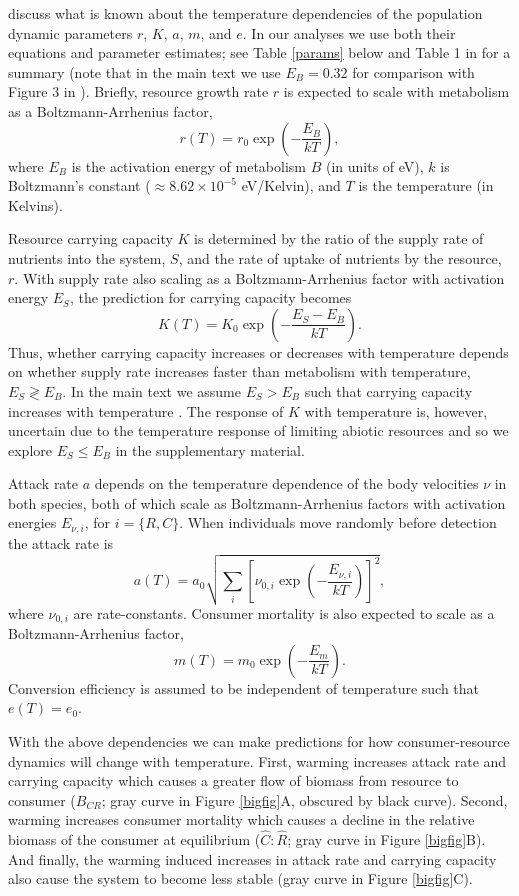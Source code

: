 \documentclass[11pt]{article}
\begin{document}
\cite{Gilbert2014} discuss what is known about the temperature dependencies of the population dynamic parameters $r$, $K$, $a$, $m$, and $e$. 
In our analyses we use both their equations and parameter estimates; see Table \ref{params} below and Table 1 in \cite{Gilbert2014} for a summary (note that in the main text we use $E_B = 0.32$ for comparison with Figure 3 in \citealt{Gilbert2014}).
Briefly, resource growth rate $r$ is expected to scale with metabolism as a Boltzmann-Arrhenius factor, 
\[r(T) = r_0 \exp \left(-\frac{E_B}{kT} \right),\] 
where $E_B$ is the activation energy of metabolism $B$ (in units of eV), $k$ is Boltzmann's constant ($\approx 8.62 \times 10^{-5}$ eV/Kelvin), and $T$ is the temperature (in Kelvins).

Resource carrying capacity $K$ is determined by the ratio of the supply rate of nutrients into the system, $S$, and the rate of uptake of nutrients by the resource, $r$.
With supply rate also scaling as a Boltzmann-Arrhenius factor with activation energy $E_S$, the prediction for carrying capacity becomes
\[K(T) = K_0 \exp \left(-\frac{E_S - E_B}{kT} \right).\] 
Thus, whether carrying capacity increases or decreases with temperature depends on whether supply rate increases faster than metabolism with temperature, $E_S \gtrless E_B$.
In the main text we assume $E_S>E_B$ such that carrying capacity increases with temperature \citep{DeLong2011,Gilbert2014}.
The response of $K$ with temperature is, however, uncertain due to the temperature response of limiting abiotic resources \citep{Savage2004,OConnor2011,Gilbert2014} and so we explore $E_S\leq E_B$ in the supplementary material.

Attack rate $a$ depends on the temperature dependence of the body velocities $\nu$ in both species, both of which scale as Boltzmann-Arrhenius factors with activation energies $E_{\nu,i}$, for $i=\{R,C\}$.
When individuals move randomly before detection the attack rate is \citep{Dell2014}
\[a(T) = a_0 \sqrt{\sum_i \left[\nu_{0,i} \exp \left(-\frac{E_{\nu,i}}{kT} \right) \right]^2},\] 
where $\nu_{0,i}$ are rate-constants.
Consumer mortality is also expected to scale as a Boltzmann-Arrhenius factor, 
\[m(T) = m_0 \exp \left( -\frac{E_m}{kT} \right).\]
Conversion efficiency is assumed to be independent of temperature such that $e(T) = e_0$.

With the above dependencies we can make predictions for how consumer-resource dynamics will change with temperature.
First, warming increases attack rate and carrying capacity which causes a greater flow of biomass from resource to consumer ($B_{CR}$; gray curve in Figure \ref{bigfig}A, obscured by black curve).
Second, warming increases consumer mortality which causes a decline in the relative biomass of the consumer at equilibrium ($\hat{C}:\hat{R}$; gray curve in Figure \ref{bigfig}B).
And finally, the warming induced increases in attack rate and carrying capacity also cause the system to become less stable (gray curve in Figure \ref{bigfig}C).
\end{document}
